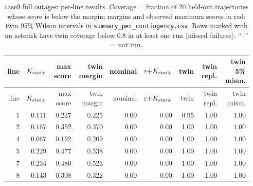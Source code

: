 \begin{longtable}{@{}rrrrrrrrr@{}}
\caption{case9 full outages: per-line results. Coverage = fraction of 20 held-out trajectories whose score is below the margin; margins and observed maximum scores in rad; twin 95\% Wilson intervals in \texttt{summary\_per\_contingency.csv}. Rows marked with an asterisk have twin coverage below 0.8 in at least one run (missed failures). ``--'' = not run.}\\
\toprule
line & $K_{\rm static}$ & max score & twin margin & nominal & $\varepsilon{+}K_{\rm static}$ & twin & twin repl. & twin 5\% mism.\\
\midrule\endfirsthead
\toprule line & $K_{\rm static}$ & max score & twin margin & nominal & $\varepsilon{+}K_{\rm static}$ & twin & twin repl. & twin mism.\\\midrule\endhead
1 & 0.111 & 0.227 & 0.225 & 0.00 & 0.00 & 0.95 & 1.00 & 1.00\\
2 & 0.167 & 0.352 & 0.370 & 0.00 & 0.00 & 1.00 & 1.00 & 1.00\\
4 & 0.067 & 0.192 & 0.209 & 0.00 & 0.00 & 1.00 & 1.00 & 1.00\\
5 & 0.229 & 0.477 & 0.538 & 0.00 & 0.00 & 1.00 & 1.00 & 1.00\\
7 & 0.234 & 0.480 & 0.523 & 0.00 & 0.00 & 1.00 & 1.00 & 1.00\\
8 & 0.143 & 0.308 & 0.322 & 0.00 & 0.00 & 1.00 & 1.00 & 1.00\\
\bottomrule
\end{longtable}
